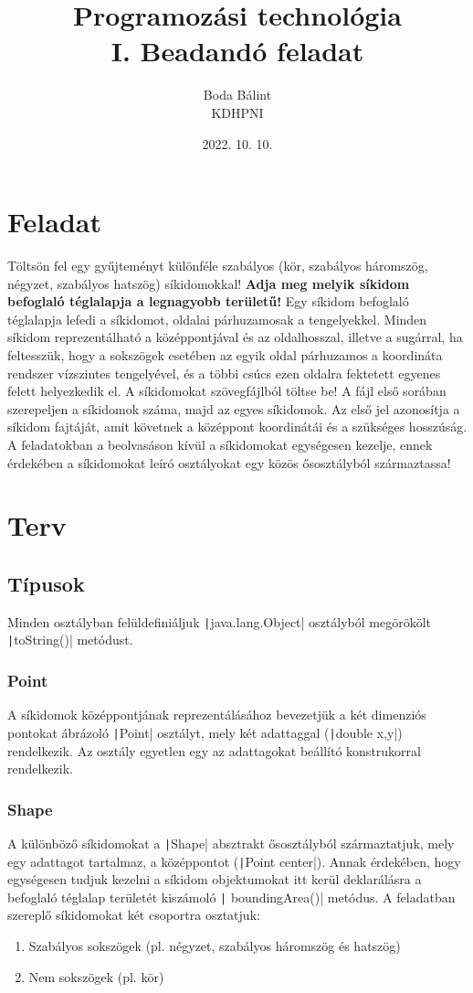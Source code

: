 \documentclass[12pt,a4paper]{article}
\title{\textbf{Programozási technológia \\ \large  I. Beadandó feladat}}
\author{Boda Bálint \\ KDHPNI}
\date{2022. 10. 10.}
\theoremstyle{definition}
\begin{document}
	\maketitle
	\section{Feladat}
	Töltsön fel egy gyűjteményt különféle szabályos (kör, szabályos háromszög, négyzet, szabályos hatszög) síkidomokkal! \textbf{Adja meg melyik síkidom befoglaló téglalapja a legnagyobb területű!} Egy síkidom befoglaló téglalapja lefedi a síkidomot, oldalai párhuzamosak a tengelyekkel. Minden síkidom reprezentálható a középpontjával és az oldalhosszal, illetve a sugárral, ha feltesszük, hogy a sokszögek esetében az egyik oldal párhuzamos a koordináta rendszer vízszintes tengelyével, és a többi csúcs ezen oldalra fektetett egyenes felett helyezkedik el. A síkidomokat szövegfájlból töltse be! A fájl első sorában szerepeljen a síkidomok száma, majd az egyes síkidomok. Az első jel azonosítja a síkidom fajtáját, amit követnek a középpont koordinátái és a szükséges hosszúság. A feladatokban a beolvasáson kívül a síkidomokat egységesen kezelje, ennek érdekében a síkidomokat leíró osztályokat egy közös ősosztályból származtassa!
	\newpage
	\section{Terv}
	\subsection{Típusok}
	Minden osztályban felüldefiniáljuk \texttt|java.lang.Object| osztályból megörökölt \texttt|toString()| metódust.
	\subsubsection{Point}
	A síkidomok középpontjának reprezentálásához bevezetjük a két dimenziós pontokat ábrázoló \texttt|Point| osztályt, mely két adattaggal (\texttt|double x,y|) rendelkezik. Az osztály egyetlen egy az adattagokat beállító konstrukorral rendelkezik. 
	
	\subsubsection{Shape}
	A különböző síkidomokat a \texttt|Shape| absztrakt ősosztályból származtatjuk, mely egy adattagot tartalmaz, a középpontot (\texttt|Point center|). Annak érdekében, hogy egységesen tudjuk kezelni a síkidom objektumokat itt kerül deklarálásra a befoglaló téglalap területét kiszámoló \texttt| boundingArea()| metódus.
	\noindent
	A feladatban szereplő síkidomokat két csoportra osztatjuk:
	\begin{enumerate}
		\item Szabályos sokszögek (pl. négyzet, szabályos háromszög és hatszög)
		\item Nem sokszögek (pl. kör)
	\end{enumerate}
\end{document}
